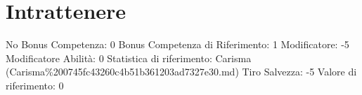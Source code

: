 \section{Intrattenere}\label{intrattenere}

\begin{description}
\tightlist
\item[Tags: ABI]
No Bonus Competenza: 0 Bonus Competenza di Riferimento: 1 Modificatore:
-5 Modificatore Abilità: 0 Statistica di riferimento: Carisma
(Carisma\%200745fc43260c4b51b361203ad7327e30.md) Tiro Salvezza: -5
Valore di riferimento: 0
\end{description}

